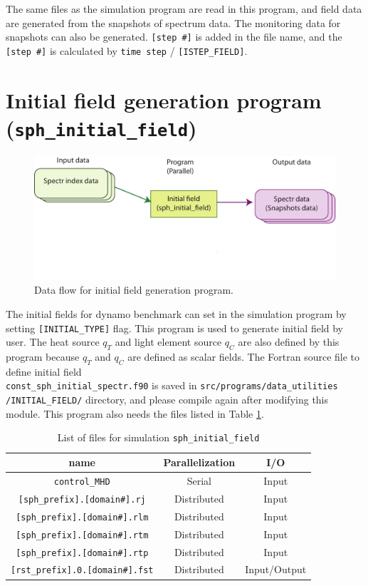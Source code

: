 The same files as the simulation program are read in this program, and field data are generated from the snapshots of spectrum data. The monitoring data for snapshots can also be generated. \verb|[step #]| is added in the file name, and the \verb|[step #]| is calculated by \verb|time step| / \verb|[ISTEP_FIELD]|.

\newpage
\section{Initial field generation program \\
({\tt sph\_initial\_field})}
\label{sec:sph_initial_field}
%
\begin{figure}[htbp]
\begin{center}
\includegraphics*[width=130mm]{images/flow_ini}
\end{center}
\caption{Data flow for initial field generation program.}
\label{fig:flow_ini}
\end{figure}
%
 The initial fields for dynamo benchmark can set in the simulation program by setting \verb|[INITIAL_TYPE]| flag. This program is used to generate initial field by user.  The heat source $q_{T}$ and light element source $q_{C}$ are also defined by this program because $q_{T}$ and $q_{C}$ are defined as scalar fields.  The Fortran source file to define initial field \\
 \verb|const_sph_initial_spectr.f90| is saved in \verb|src/programs/data_utilities| \\
 \verb|/INITIAL_FIELD/| directory,  and please compile again after modifying this module. This program also needs the files listed in Table \ref{table:inital_fld}.
%
\begin{table}[htp]
\caption{List of files for simulation {\tt sph\_initial\_field} }
\begin{center} 
\begin{tabular}{|c|c|c|}
\hline
 name & Parallelization & I/O \\ \hline \hline
\verb|control_MHD| & Serial & Input \\ \hline
\verb|[sph_prefix].[domain#].rj|  & Distributed & Input \\
\verb|[sph_prefix].[domain#].rlm| & Distributed & Input \\
\verb|[sph_prefix].[domain#].rtm| & Distributed & Input \\
\verb|[sph_prefix].[domain#].rtp| & Distributed & Input \\ \hline
\verb|[rst_prefix].0.[domain#].fst| &  Distributed & Input/Output  \\ \hline
\end{tabular}
\end{center}
\label{table:inital_fld}
\end{table}
